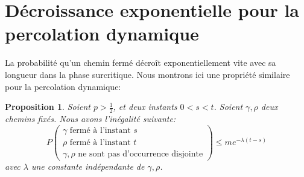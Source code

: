 \documentclass[titlepage,a4paper,12pt]{article}
\newcounter{prop}
\newtheorem{decexp}[prop]{Proposition}
\begin{document}
\section{Décroissance exponentielle pour la percolation dynamique}
La probabilité qu'un chemin fermé décroît exponentiellement vite avec sa longueur dans la phase surcritique. Nous montrons ici une propriété similaire pour la percolation dynamique: 

\begin{decexp}
Soient $p>\frac{1}{2}$, et deux instants $0<s<t$. Soient $\gamma,\rho$ deux chemins fixés. Nous avons l'inégalité suivante:
$$P\left(\begin{array}{c} \gamma \text{ fermé à l'instant }s\\
\rho \text{ fermé à l'instant }t\\
\gamma, \rho \text{ ne sont pas d'occurrence disjointe}
\end{array}\right)\leqslant me^{-\lambda(t-s)}
$$
avec $\lambda$ une constante indépendante de $\gamma,\rho$.
\end{decexp}
\end{document}
